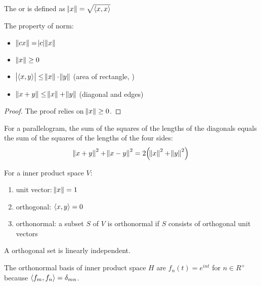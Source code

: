 \begin{definition}[Norm]
    The  or  is defined as $\norm{x} = \sqrt{\innerproduct{x}{x}}$    
\end{definition}


\begin{theorem}
    The property of norm:
    \begin{itemize}
    \item $\norm{cx} = \abs{c} \norm{x}$
    \item $\norm{x} \geq 0$
    \item $\absolutevalue{\innerproduct{x}{y}} \leq \norm{x} \cdot \norm{y}$ (area of rectangle, )
    \item $\norm{x+y} \leq \norm{x} + \norm{y}$ (diagonal and edges)
    \end{itemize}
\end{theorem}

\begin{proof}
    The proof relies on $\norm{x} \geq 0$.
\end{proof}




\begin{theorem}
    For a parallelogram, the sum of the squares of the lengths of the diagonals equals the sum of the squares of the lengths of the four sides:
    \begin{equation}
        \norm{x + y}^2 + \norm{x-y}^2 = 2 \mleft(\norm{x}^2 + \norm{y}^2\mright)
    \end{equation}    
\end{theorem}


\begin{definition}
    For a inner product space $V$:
    \begin{enumerate}
        \item unit vector: $\norm{x} =1$
        \item orthogonal: $\innerproduct{x}{y} = 0$
        \item orthonormal: a subset $S$ of $V$ is orthonormal if $S$ consists of orthogonal unit vectors
    \end{enumerate}
\end{definition}

A orthogonal set is linearly independent.

The orthonormal basis of inner product space $H$ are $f_n(t) = e^{int}$ for $n \in R^+$ because $\innerproduct{f_m}{f_n} = \delta_{mn} $.

